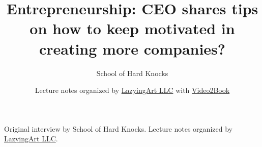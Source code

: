 \documentclass[11pt,oneside]{book}
\begin{document}
\frontmatter
\title{Entrepreneurship: CEO shares tips on how to keep motivated in creating more companies?}
\author{School of Hard Knocks}
\date{Lecture notes organized by \href{https://lazying.art}{LazyingArt LLC} with \href{https://github.com/lachlanchen/Video2Book}{Video2Book}}
\maketitle
\begin{center}
\small Original interview by School of Hard Knocks. Lecture notes organized by \href{https://lazying.art}{LazyingArt LLC}.
\end{center}
\clearpage
\mainmatter

\end{document}
